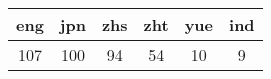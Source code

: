 \documentclass{article}
\begin{document}
\centering
\begin{table}[!h]

\begin{tabular}{|c|c|c|c|c|c|}
\hline 

eng & jpn & zhs & zht & yue & ind \\
\hline 
107 & 100 & 94 & 54 & 10 & 9 \\
\hline

\end{tabular}
\end{table}
\end{document}
